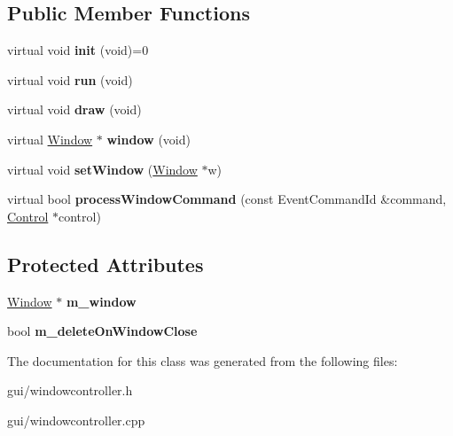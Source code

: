 \subsection*{Public Member Functions}
\begin{DoxyCompactItemize}
\item 
virtual void {\bfseries init} (void)=0\hypertarget{classWindowController_ae76a8ef879eeb85cd96b29673369503d}{}\label{classWindowController_ae76a8ef879eeb85cd96b29673369503d}

\item 
virtual void {\bfseries run} (void)\hypertarget{classWindowController_aa47d23418fd90e49b92a17be64a34175}{}\label{classWindowController_aa47d23418fd90e49b92a17be64a34175}

\item 
virtual void {\bfseries draw} (void)\hypertarget{classWindowController_a289f962707645e1c937875f77d2453a8}{}\label{classWindowController_a289f962707645e1c937875f77d2453a8}

\item 
virtual \hyperlink{classWindow}{Window} $\ast$ {\bfseries window} (void)\hypertarget{classWindowController_a3b7fb179721335a41dcf8290c472b7c4}{}\label{classWindowController_a3b7fb179721335a41dcf8290c472b7c4}

\item 
virtual void {\bfseries set\+Window} (\hyperlink{classWindow}{Window} $\ast$w)\hypertarget{classWindowController_a268d0a9235c4321704b46acc6226ab01}{}\label{classWindowController_a268d0a9235c4321704b46acc6226ab01}

\item 
virtual bool {\bfseries process\+Window\+Command} (const Event\+Command\+Id \&command, \hyperlink{classControl}{Control} $\ast$control)\hypertarget{classWindowController_af4469c12c195e17f9865d3fa7b9dca76}{}\label{classWindowController_af4469c12c195e17f9865d3fa7b9dca76}

\end{DoxyCompactItemize}
\subsection*{Protected Attributes}
\begin{DoxyCompactItemize}
\item 
\hyperlink{classWindow}{Window} $\ast$ {\bfseries m\+\_\+window}\hypertarget{classWindowController_aeaeea115c9dfad44f496ab1392d4acf7}{}\label{classWindowController_aeaeea115c9dfad44f496ab1392d4acf7}

\item 
bool {\bfseries m\+\_\+delete\+On\+Window\+Close}\hypertarget{classWindowController_aa1813600bce42a627f87ebb9fa69b0a1}{}\label{classWindowController_aa1813600bce42a627f87ebb9fa69b0a1}

\end{DoxyCompactItemize}


The documentation for this class was generated from the following files\+:\begin{DoxyCompactItemize}
\item 
gui/windowcontroller.\+h\item 
gui/windowcontroller.\+cpp\end{DoxyCompactItemize}
